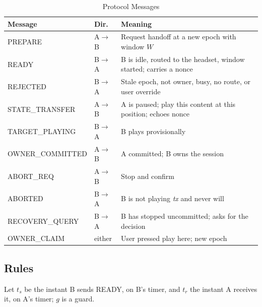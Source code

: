 \documentclass[conference]{IEEEtran}
\begin{document}
\begin{table}[t]
\caption{Protocol Messages}
\label{tab:msgs}
\centering
\footnotesize
\setlength{\tabcolsep}{4pt}
\begin{tabularx}{\columnwidth}{@{}>{\scriptsize\raggedright\arraybackslash}p{2.55cm}L{0.72cm}Y@{}}
\toprule
\textbf{Message} & \textbf{Dir.} & \textbf{Meaning} \\
\midrule
PREPARE & A$\to$B & Request handoff at a new epoch with window $W$ \\
READY & B$\to$A & B is idle, routed to the headset, window started; carries a nonce \\
REJECTED & B$\to$A & Stale epoch, not owner, busy, no route, or user override \\
STATE\_TRANSFER & A$\to$B & A is paused; play this content at this position; echoes nonce \\
TARGET\_PLAYING & B$\to$A & B plays provisionally \\
OWNER\_COMMITTED & A$\to$B & A committed; B owns the session \\
ABORT\_REQ & A$\to$B & Stop and confirm \\
ABORTED & B$\to$A & B is not playing \textit{tx} and never will \\
RECOVERY\_QUERY & B$\to$A & B has stopped uncommitted; asks for the decision \\
OWNER\_CLAIM & either & User pressed play here; new epoch \\
\bottomrule
\end{tabularx}
\end{table}

\subsection{Rules}

Let $t_s$ be the instant B sends READY, on B's timer, and $t_r$ the instant A receives it, on A's timer; $g$ is a guard.
\end{document}

